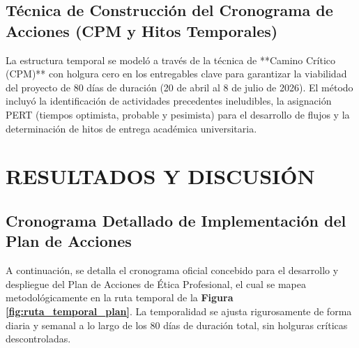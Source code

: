 \documentclass[12pt,a4paper]{article}
\begin{document}
\subsection{Técnica de Construcción del Cronograma de Acciones (CPM y Hitos Temporales)}
La estructura temporal se modeló a través de la técnica de **Camino Crítico (CPM)** con holgura cero en los entregables clave para garantizar la viabilidad del proyecto de 80 días de duración (20 de abril al 8 de julio de 2026). El método incluyó la identificación de actividades precedentes ineludibles, la asignación PERT (tiempos optimista, probable y pesimista) para el desarrollo de flujos y la determinación de hitos de entrega académica universitaria.

\newpage

\section{RESULTADOS Y DISCUSIÓN}
\thispagestyle{empty}

\subsection{Cronograma Detallado de Implementación del Plan de Acciones}
A continuación, se detalla el cronograma oficial concebido para el desarrollo y despliegue del Plan de Acciones de Ética Profesional, el cual se mapea metodológicamente en la ruta temporal de la \textbf{Figura \ref{fig:ruta_temporal_plan}}. La temporalidad se ajusta rigurosamente de forma diaria y semanal a lo largo de los 80 días de duración total, sin holguras críticas descontroladas.
\end{document}
